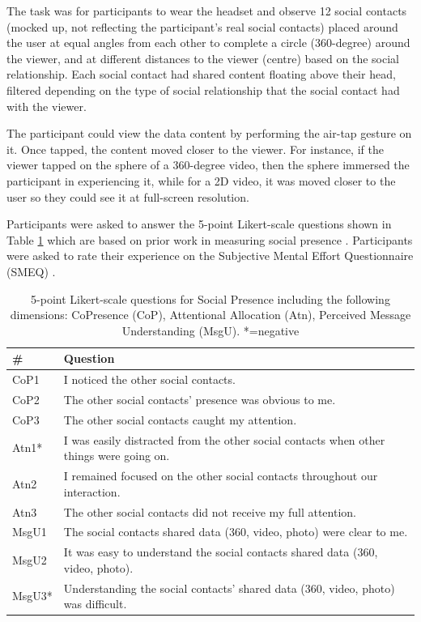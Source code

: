 The task was for participants to wear the headset and observe 12 social contacts (mocked up, not reflecting the participant's real social contacts) placed around the user at equal angles from each other to complete a circle (360-degree) around the viewer, and at different distances to the viewer (centre) based on the social relationship. Each social contact had shared content floating above their head, filtered depending on the type of social relationship that the social contact had with the viewer. 

The participant could view the data content by performing the air-tap gesture on it. Once tapped, the content moved closer to the viewer. For instance, if the viewer tapped on the sphere of a 360-degree video, then the sphere immersed the participant in experiencing it, while for a 2D video, it was moved closer to the user so they could see it at full-screen resolution.

Participants were asked to answer the 5-point Likert-scale questions shown in Table \ref{tbl:chi18:questions} which are based on prior work in measuring social presence \cite{Biocca2003}. Participants were asked to rate their experience on the Subjective Mental Effort Questionnaire (SMEQ) \cite{Sauro2009}. 

\begin{table}[ht]
    \centering
    \begin{tabular}{l p{10cm}}
        \hline
        #  & Question \\ \hline
        CoP1 & I noticed the other social contacts.  \\
        CoP2 & The other social contacts' presence was obvious to me. \\
        CoP3 & The other social contacts caught my attention. \\ \hline
        Atn1* & I was easily distracted from the other social contacts when other things were going on. \\
        Atn2 & I remained focused on the other social contacts throughout our interaction. \\
        Atn3 & The other social contacts did not receive my full attention.  \\ \hline
        MsgU1 & The social contacts shared data (360, video, photo) were clear to me.  \\
        MsgU2 & It was easy to understand the social contacts shared data (360, video, photo).  \\
        MsgU3* & Understanding the social contacts' shared data (360, video, photo) was difficult.  \\ \hline
    \end{tabular}
    \caption{5-point Likert-scale questions for Social Presence including the following dimensions: CoPresence (CoP), Attentional Allocation (Atn), Perceived Message Understanding (MsgU). *=negative} 
      \label{tbl:chi18:questions}
\end{table}

